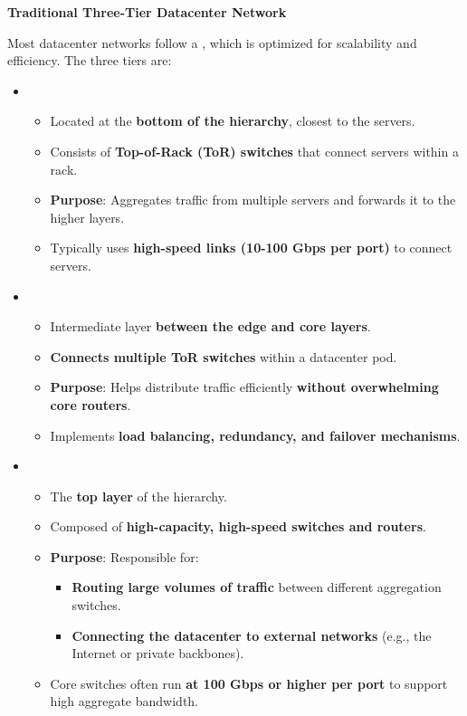 \highspace
\begin{flushleft}
    \textcolor{Green3}{ \textbf{Traditional Three-Tier Datacenter Network}}
\end{flushleft}
Most datacenter networks follow a , which is optimized for scalability and efficiency. The three tiers are:
\begin{itemize}
    \item {}
    \begin{itemize}
        \item Located at the \textbf{bottom of the hierarchy}, closest to the servers.
        \item Consists of \textbf{Top-of-Rack (ToR) switches} that connect servers within a rack.
        \item \textcolor{Green3}{\textbf{Purpose}}: Aggregates traffic from multiple servers and forwards it to the higher layers.
        \item Typically uses \textbf{high-speed links (10-100 Gbps per port)} to connect servers.
    \end{itemize}


    \item {}
    \begin{itemize}
        \item Intermediate layer \textbf{between the edge and core layers}.
        \item \textbf{Connects multiple ToR switches} within a datacenter pod.
        \item \textcolor{Green3}{\textbf{Purpose}}: Helps distribute traffic efficiently \textbf{without overwhelming core routers}.
        \item Implements \textbf{load balancing, redundancy, and failover mechanisms}.
    \end{itemize}


    \item {}
    \begin{itemize}
        \item The \textbf{top layer} of the hierarchy.
        \item Composed of \textbf{high-capacity, high-speed switches and routers}.
        \item \textcolor{Green3}{\textbf{Purpose}}: Responsible for:
        \begin{itemize}
            \item \textbf{Routing large volumes of traffic} between different aggregation switches.
            \item \textbf{Connecting the datacenter to external networks} (e.g., the Internet or private backbones).
        \end{itemize}
        \item Core switches often run \textbf{at 100 Gbps or higher per port} to support high aggregate bandwidth.
    \end{itemize}
\end{itemize}
